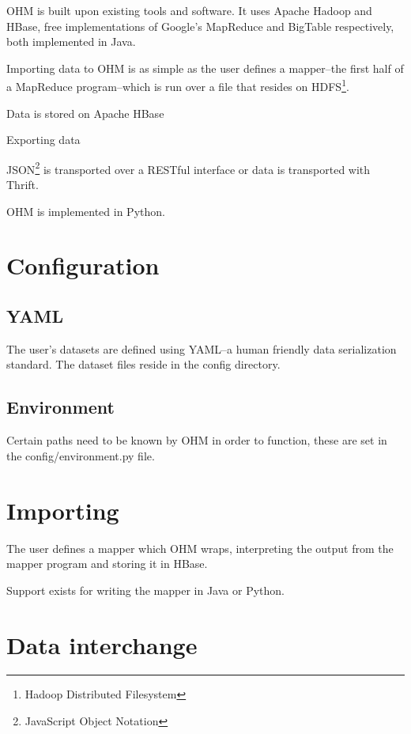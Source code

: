 \documentclass[a4paper,10pt]{book}
\begin{document}
OHM is built upon existing tools and software. It uses Apache Hadoop and
HBase, free implementations of Google's MapReduce and BigTable
respectively, both implemented in Java.

Importing data to OHM is as simple as the user defines a mapper--the first
half of a MapReduce program--which is run over a file that resides on
HDFS\footnote{Hadoop Distributed Filesystem}.

Data is stored on Apache HBase

Exporting data

JSON\footnote{JavaScript Object Notation} is transported over a RESTful
interface or data is transported with Thrift.

OHM is implemented in Python.



\section{Configuration}

\subsection{YAML}

The user's datasets are defined using YAML--a human friendly data
serialization standard. The dataset files reside in the config directory.


\subsection{Environment}

Certain paths need to be known by OHM in order to function, these are set
in the config/environment.py file.



\section{Importing}

The user defines a mapper which OHM wraps, interpreting the output from the
mapper program and storing it in HBase.

Support exists for writing the mapper in Java or Python.



\section{Data interchange}
\end{document}
